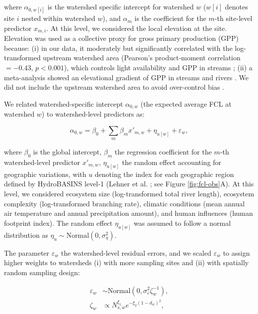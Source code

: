 \documentclass[11pt, class=article, crop=false]{standalone}
\begin{document}
where $\alpha_{0, w[i]}$ is the watershed specific intercept for watershed $w$ ($w[i]$ denotes site $i$ nested within watershed $w$), and $\alpha_m$ is the coefficient for the $m$-th site-level predictor $x_{m, i}$.
At this level, we considered the local elevation at the site. 
Elevation was used as a collective proxy for gross primary production (GPP) because: (i) in our data, it moderately but significantly correlated with the log-transformed upstream watershed area (Pearson's product-moment correlation $= -0.43$, $p < 0.001$), which controls light availability and GPP in streams \citep{finlay_light-mediated_2011, finlay_stream_2011, bernhardt_light_2022}; (ii) a meta-analysis showed an elevational gradient of GPP in streams and rivers \citep{marzolf_ecosystem_2021}.
We did not include the upstream watershed area to avoid over-control bias \citep{arif_predictive_2022}.

We related watershed-specific intercept $\alpha_{0, w}$ (the expected average FCL at watershed $w$) to watershed-level predictors as:

\begin{equation}
    \alpha_{0, w} = \beta_0 + \sum_m \beta_m x'_{m, w} + \eta_{u[w]} + \varepsilon_{w},
    \label{eq:watershed-avarage}
\end{equation}

where $\beta_0$ is the global intercept, $\beta_m$ the regression coefficient for the $m$-th watershed-level predictor $x'_{m, w}$, $\eta_{u[w]}$ the random effect accounting for geographic variations, with $u$ denoting the index for each geographic region defined by HydroBASINS level-1 (Lehner et al. \citep{lehner_global_2013}; see Figure \ref{fig:fcl-obs}A).
At this level, we considered ecosystem size (log-transformed total river length), ecosystem complexity (log-transformed branching rate), climatic conditions (mean annual air temperature and annual precipitation amount), and human influences (human footprint index).
The random effect $\eta_{u[w]}$ was assumed to follow a normal distribution as $\eta_{u} \sim \mbox{Normal}(0, \sigma_{\eta}^2)$.

The parameter $\varepsilon_w$ the watershed-level residual errors, and we scaled $\varepsilon_w$ to assign higher weights to watersheds (i) with more sampling sites and (ii) with spatially random sampling design:

\begin{align}
    \varepsilon_w &\sim \mbox{Normal}(0, \sigma_{\varepsilon}^2 \zeta_w^{-1}),\\
    \zeta_w &\propto N_{s, w}^{\xi_1} e^{-\xi_2 (1 - d_{w})^2},
\end{align}
\end{document}
